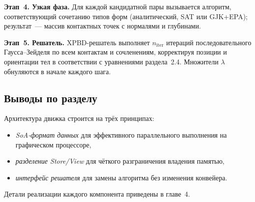 \textbf{Этап~4. Узкая фаза.} Для каждой кандидатной пары вызывается алгоритм, соответствующий сочетанию типов 
форм (аналитический, SAT или GJK+EPA); результат~--- массив контактных точек с нормалями и глубинами.

\textbf{Этап~5. Решатель.} XPBD-решатель выполняет $n_{\text{iter}}$ итераций последовательного 
Гаусса--Зейделя по всем контактам и сочленениям, корректируя позиции и ориентации тел в соответствии с 
уравнениями раздела~2.4. Множители $\lambda$ обнуляются в начале каждого шага.

\subsection{Выводы по разделу}

Архитектура движка строится на трёх принципах:
\begin{itemize}
  \item \textit{SoA-формат данных} для эффективного параллельного выполнения на графическом процессоре,
  \item \textit{разделение Store/View} для чёткого разграничения владения памятью,
  \item \textit{интерфейс решателя} для замены алгоритма без изменения конвейера.
\end{itemize}

Детали реализации каждого компонента приведены в главе~4.
